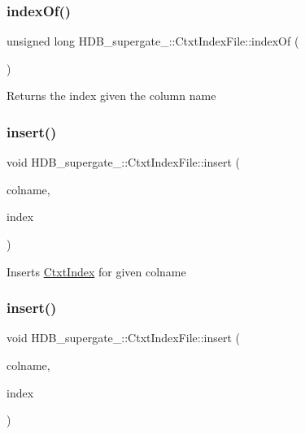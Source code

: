 \subsubsection{\texorpdfstring{index\+Of()}{indexOf()}\hspace{0.1cm}{\footnotesize\ttfamily [2/2]}}
{\footnotesize\ttfamily unsigned long H\+D\+B\+\_\+supergate\+\_\+\+::\+Ctxt\+Index\+File\+::index\+Of (\begin{DoxyParamCaption}\item[{std\+::string}]{ }\end{DoxyParamCaption})}

Returns the index given the column name \mbox{\label{classHDB__supergate___1_1CtxtIndexFile_ab581d8e3c893b29a80b18413b1c45412}} 
\subsubsection{\texorpdfstring{insert()}{insert()}\hspace{0.1cm}{\footnotesize\ttfamily [1/2]}}
{\footnotesize\ttfamily void H\+D\+B\+\_\+supergate\+\_\+\+::\+Ctxt\+Index\+File\+::insert (\begin{DoxyParamCaption}\item[{std\+::string}]{colname,  }\item[{\hyperlink{classHDB__supergate___1_1CtxtIndex}{Ctxt\+Index} \&}]{index }\end{DoxyParamCaption})}

Inserts \hyperlink{classHDB__supergate___1_1CtxtIndex}{Ctxt\+Index} for given colname \mbox{\label{classHDB__supergate___1_1CtxtIndexFile_ab581d8e3c893b29a80b18413b1c45412}} 
\subsubsection{\texorpdfstring{insert()}{insert()}\hspace{0.1cm}{\footnotesize\ttfamily [2/2]}}
{\footnotesize\ttfamily void H\+D\+B\+\_\+supergate\+\_\+\+::\+Ctxt\+Index\+File\+::insert (\begin{DoxyParamCaption}\item[{std\+::string}]{colname,  }\item[{\hyperlink{classHDB__supergate___1_1CtxtIndex}{Ctxt\+Index} \&}]{index }\end{DoxyParamCaption})}


